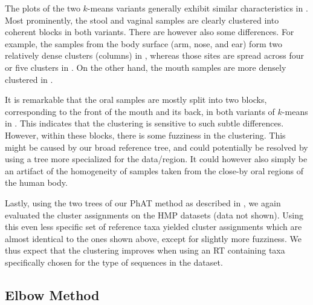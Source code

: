 The plots of the two $k$-means variants generally exhibit similar characteristics in .
Most prominently, the stool and vaginal samples are clearly clustered into coherent blocks in both variants.
There are however also some differences.
For example, the samples from the body surface (arm, nose, and ear)
form two relatively dense clusters (columns) in ,
whereas those sites are spread across four or five clusters in .
On the other hand, the mouth samples are more densely clustered in .

It is remarkable that the oral samples are mostly split into two blocks,
corresponding to the front of the mouth and its back, in both variants of $k$-means in .
This indicates that the clustering is sensitive to such subtle differences.
However, within these blocks, there is some fuzziness in the clustering.
This might be caused by our broad reference tree,
and could potentially be resolved by using a tree more specialized for the data/region.
It could however also simply be an artifact of the homogeneity of samples
taken from the close-by oral regions of the human body.

Lastly, using the two  trees of our \ac{PhAT} method
as described in ,
we again evaluated the cluster assignments on the \ac{HMP} datasets (data not shown).
Using this even less specific set of reference taxa yielded cluster assignments
which are almost identical to the ones shown above, except for slightly more fuzziness.
We thus expect that the clustering improves when using an \ac{RT}
containing taxa specifically chosen for the type of sequences in the dataset.


\subsection{Elbow Method}
\label{ch:Clustering:sec:Results:sub:ElbowMethod}

